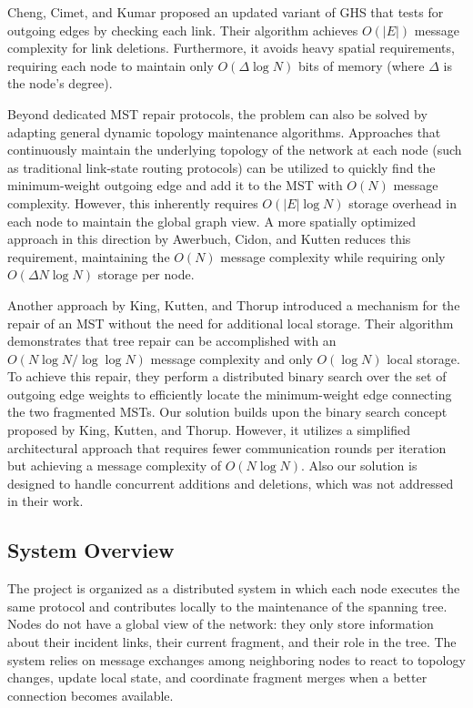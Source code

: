 Cheng, Cimet, and Kumar \cite{cheng1988protocolmaintainmst} proposed an updated variant of GHS that tests for outgoing edges by checking each link. Their algorithm achieves $O(|E|)$ message complexity for link deletions. Furthermore, it avoids heavy spatial requirements, requiring each node to maintain only $O(\Delta \log N)$ bits of memory (where $\Delta$ is the node's degree).

Beyond dedicated MST repair protocols, the problem can also be solved by adapting general dynamic topology maintenance algorithms. Approaches that continuously maintain the underlying topology of the network at each node (such as traditional link-state routing protocols) can be utilized to quickly find the minimum-weight outgoing edge and add it to the MST with $O(N)$ message complexity. However, this inherently requires $O(|E| \log N)$ storage overhead in each node to maintain the global graph view. A more spatially optimized approach in this direction by Awerbuch, Cidon, and Kutten\cite{Awerbuch2008Optimal} reduces this requirement, maintaining the $O(N)$ message complexity while requiring only $O(\Delta N \log N)$ storage per node.

Another approach by King, Kutten, and Thorup \cite{king2015constructionimprompturepairmst} introduced a mechanism for the repair of an MST without the need for additional local storage. Their algorithm demonstrates that tree repair can be accomplished with an $O(N \log N / \log \log N)$ message complexity and only $O(\log N)$ local storage. To achieve this repair, they perform a distributed binary search over the set of outgoing edge weights to efficiently locate the minimum-weight edge connecting the two fragmented MSTs. Our solution builds upon the binary search concept proposed by King, Kutten, and Thorup\cite{king2015constructionimprompturepairmst}. However, it utilizes a simplified architectural approach that requires fewer communication rounds per iteration but achieving a message complexity of $O(N \log N)$. Also our solution is designed to handle concurrent additions and deletions, which was not addressed in their work.

\subsection{System Overview}
The project is organized as a distributed system in which each node executes the same protocol and contributes locally to the maintenance of the spanning tree. Nodes do not have a global view of the network: they only store information about their incident links, their current fragment, and their role in the tree. The system relies on message exchanges among neighboring nodes to react to topology changes, update local state, and coordinate fragment merges when a better connection becomes available.

